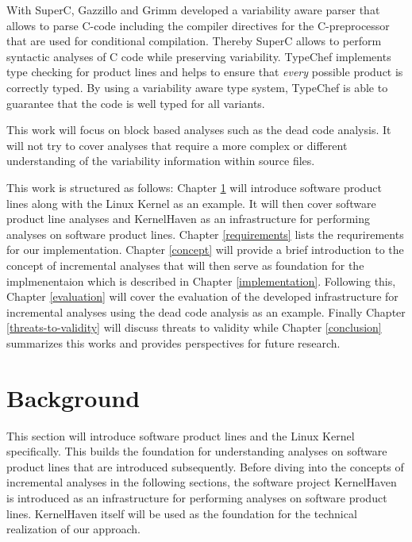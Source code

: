 \documentclass[a4paper]{article}
\begin{document}
With SuperC, Gazzillo and Grimm \cite{gazzillo-grimm} developed a variability aware parser that allows to parse C-code including the compiler directives for the C-preprocessor that are used for conditional compilation. Thereby SuperC allows to perform syntactic analyses of C code while preserving variability. 
TypeChef \cite{Kenner:2010:TTT:1868688.1868693} implements type checking for product lines and helps to ensure that \emph{every} possible product is correctly typed.  By using a variability aware type system, TypeChef is able to guarantee that the code is well typed for all variants.

This work will focus on block based analyses such as the dead code analysis. It will not try to cover analyses that require a more complex or different understanding of the variability information within source files.

This work is structured as follows: Chapter \ref{background} will introduce software product lines along with the Linux Kernel as an example. It will then cover software product line analyses and KernelHaven as an infrastructure for performing analyses on software product lines. Chapter \ref{requirements} lists the requrirements for our implementation. Chapter \ref{concept} will provide a brief introduction to the concept of incremental analyses that will then serve as foundation for the implmenentaion which is described in Chapter \ref{implementation}. Following this, Chapter \ref{evaluation} will cover the evaluation of the developed infrastructure for incremental analyses using the dead code analysis as an example. Finally Chapter \ref{threats-to-validity} will discuss threats to validity while Chapter \ref{conclusion} summarizes this works and provides perspectives for future research.

\section{Background} \label{background}

This section will introduce software product lines and the Linux Kernel specifically. This builds the foundation for understanding analyses on software product lines that are introduced subsequently. Before diving into the concepts of incremental analyses in the following sections, the software project KernelHaven is introduced as an infrastructure for performing analyses on software product lines. KernelHaven itself will be used as the foundation for the technical realization of our approach.
\end{document}
